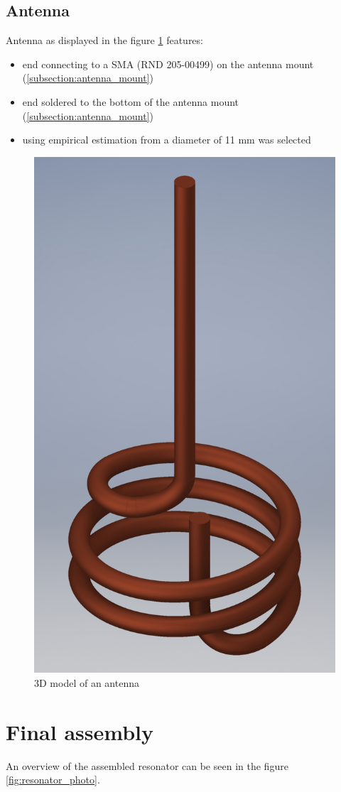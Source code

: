\clearpage
\subsection{Antenna}
\label{subsection:antenna}
Antenna as displayed in the figure \ref{fig:antenna} features:
\begin{itemize}
	\item end connecting to a SMA (RND 205-00499) on the antenna mount (\ref{subsection:antenna_mount})
	\item end soldered to the bottom of the antenna mount (\ref{subsection:antenna_mount})
	\item using empirical estimation from \cite{Siverns2012} a diameter of 11 mm was selected
\end{itemize}

\begin{figure}[h]
	\centering
	\includegraphics[width=.71\textwidth]{images/antenna_small}
	\caption{3D model of an antenna}
	\label{fig:antenna}
\end{figure}

\section{Final assembly}
An overview of the assembled resonator can be seen in the figure \ref{fig:resonator_photo}.

